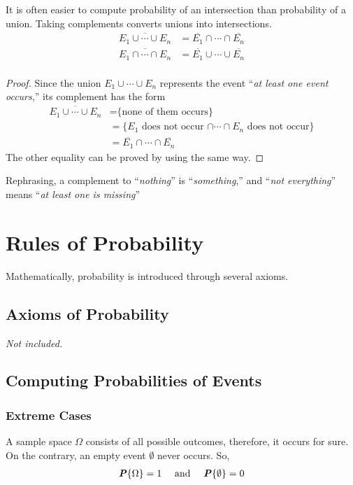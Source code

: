 \documentclass{article}
\begin{document}
It is often easier to compute probability of an intersection than probability of a union. Taking complements converts unions into intersections.
\begin{align*}
    \overline{E_1 \cup \cdots \cup E_n} &= \overline{E_1} \cap \cdots \cap \overline{E_n}\\
    \overline{E_1 \cap \cdots \cap E_n} &= \overline{E_1} \cup \cdots \cup \overline{E_n}\\
\end{align*}
\begin{proof}
Since the union $E_1 \cup \cdots \cup E_n$ represents the event “\textit{at least one event occurs},” its complement has the form
\begin{align*}
    \overline{E_1 \cup \cdots \cup E_n} &= \text{\{none of them occurs\}}\\
    &= \text{\{$E_1$ does not occur $\cap \cdots \cap E_n$ does not occur\}}\\
    &= \overline{E_1} \cap \cdots \cap \overline{E_n}
\end{align*}
The other equality can be proved by using the same way.
\end{proof}

Rephrasing, a complement to “\textit{nothing}” is “\textit{something},” and “\textit{not everything}” means “\textit{at least one is missing}”


\section{Rules of Probability}

Mathematically, probability is introduced through several axioms.

\subsection{Axioms of Probability}

\textit{Not included.}

\subsection{Computing Probabilities of Events}

\subsubsection{Extreme Cases}

A sample space $\Omega$ consists of all possible outcomes, therefore, it occurs for sure. On the contrary, an empty event $\emptyset$ never occurs. So,
\begin{align*}
    &\textbf{\textit{P}}\{\Omega\} = 1 &\text{ and }& &\textbf{\textit{P}}\{\emptyset\} = 0
\end{align*}
\end{document}
